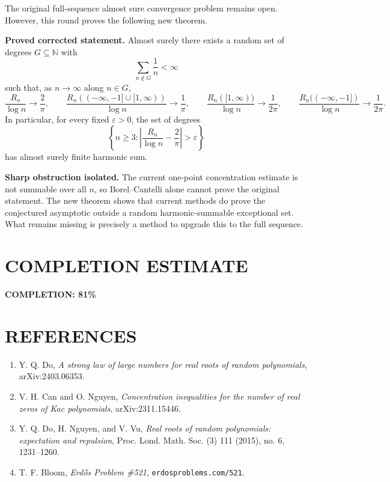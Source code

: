 The original full-sequence almost sure convergence problem remains open. However, this round proves the following new theorem.

\medskip
\noindent\textbf{Proved corrected statement.} Almost surely there exists a random set of degrees $G\subseteq\mathbb N$ with
\[
\sum_{n\notin G}\frac1n<\infty
\]
such that, as $n\to\infty$ along $n\in G$,
\[
\frac{R_n}{\log n}\to\frac{2}{\pi},
\qquad
\frac{R_n((-\infty,-1]\cup[1,\infty))}{\log n}\to\frac1\pi,
\qquad
\frac{R_n([1,\infty))}{\log n}\to\frac1{2\pi},
\qquad
\frac{R_n((-\infty,-1])}{\log n}\to\frac1{2\pi}.
\]
In particular, for every fixed $\varepsilon>0$, the set of degrees
\[
\left\{n\ge3:\left|\frac{R_n}{\log n}-\frac{2}{\pi}\right|>\varepsilon\right\}
\]
has almost surely finite harmonic sum.

\medskip
\noindent\textbf{Sharp obstruction isolated.} The current one-point concentration estimate is not summable over all $n$, so Borel--Cantelli alone cannot prove the original statement. The new theorem shows that current methods do prove the conjectured asymptotic outside a random harmonic-summable exceptional set. What remains missing is precisely a method to upgrade this to the full sequence.

\section{COMPLETION ESTIMATE}

\textbf{COMPLETION: 81\%}

\section{REFERENCES}

\begin{enumerate}
\item Y. Q. Do, \emph{A strong law of large numbers for real roots of random polynomials}, arXiv:2403.06353.
\item V. H. Can and O. Nguyen, \emph{Concentration inequalities for the number of real zeros of Kac polynomials}, arXiv:2311.15446.
\item Y. Q. Do, H. Nguyen, and V. Vu, \emph{Real roots of random polynomials: expectation and repulsion}, Proc. Lond. Math. Soc. (3) 111 (2015), no. 6, 1231--1260.
\item T. F. Bloom, \emph{Erd\H{o}s Problem \#521}, \texttt{erdosproblems.com/521}.
\end{enumerate}
